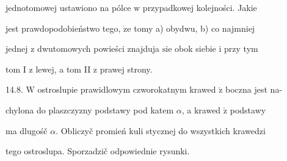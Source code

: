 \documentclass[a4paper,12pt]{article}
\begin{document}
jednotomowej ustawiono na pólce $\mathrm{w}$ przypadkowej kolejności. Jakie

jest prawdopodobieństwo tego, $\dot{\mathrm{z}}\mathrm{e}$ tomy a) obydwu, b) co najmniej

jednej $\mathrm{z}$ dwutomowych powieści znajduja $\mathrm{s}\mathrm{i}\mathrm{e}$ obok siebie $\mathrm{i}$ przy tym

tom I $\mathrm{z}$ lewej, a tom II $\mathrm{z}$ prawej strony.

14.8. $\mathrm{W}$ ostroslupie prawidlowym czworokatnym krawed $\acute{\mathrm{z}}$ boczna jest na-

chylona do plaszczyzny podstawy pod katem $\alpha$, a krawed $\acute{\mathrm{z}}$ podstawy

ma dlugośč $\alpha$. Obliczyč promień kuli stycznej do wszystkich krawedzi

tego ostroslupa. Sporzadzič odpowiednie rysunki.
\end{document}
